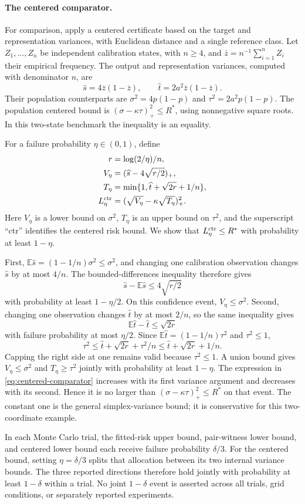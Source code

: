 \paragraph{The centered comparator.}
For comparison, apply a centered certificate based on the target and
representation variances, with Euclidean distance and a single reference
class. Let $Z_1,\ldots,Z_n$
be independent calibration states, with $n\geq4$, and
$\bar z=n^{-1}\sum_{i=1}^nZ_i$ their empirical frequency. The output and
representation variances, computed with denominator $n$, are
\[
 \widehat s=4\bar z(1-\bar z),\qquad
 \widehat t=2a^2\bar z(1-\bar z).
\]
Their population counterparts are
$\sigma^2=4p(1-p)$ and $\tau^2=2a^2p(1-p)$.
The population centered bound is
$(\sigma-\kappa\tau)_+^2\leq R^*$, using nonnegative square roots.
In this two-state benchmark the inequality is an equality.

For a failure probability $\eta\in(0,1)$, define
\begin{align}
 r&=\log(2/\eta)/n,\nonumber\\
 V_\eta&=(\widehat s-4\sqrt{r/2})_+,\nonumber\\
 T_\eta&=\min\{1,\widehat t+\sqrt{2r}+1/n\},\nonumber\\
 L^{\rm ctr}_\eta&=(\sqrt{V_\eta}-\kappa\sqrt{T_\eta})_+^2.
 \label{eq:centered-comparator}
\end{align}
Here $V_\eta$ is a lower bound on $\sigma^2$, $T_\eta$ is an upper
bound on $\tau^2$, and the superscript ``ctr'' identifies the centered
risk bound. We show that $L^{\rm ctr}_\eta\leq R^*$ with probability
at least $1-\eta$.

First, $\mathbb E\widehat s=(1-1/n)\sigma^2\leq\sigma^2$, and
changing one calibration observation changes $\widehat s$ by at most
$4/n$. The bounded-differences inequality therefore gives
\[
 \widehat s-\mathbb E\widehat s\leq4\sqrt{r/2}
\]
with probability at least $1-\eta/2$. On this confidence event,
$V_\eta\leq\sigma^2$.
Second, changing one observation changes $\widehat t$ by at most $2/n$,
so the same inequality gives
\[
 \mathbb E\widehat t-\widehat t\leq\sqrt{2r}
\]
with failure probability at most $\eta/2$. Since
$\mathbb E\widehat t=(1-1/n)\tau^2$ and $\tau^2\leq1$,
\[
 \tau^2\leq\widehat t+\sqrt{2r}+\tau^2/n
          \leq\widehat t+\sqrt{2r}+1/n.
\]
Capping the right side at one remains valid because $\tau^2\leq1$.
A union bound gives $V_\eta\leq\sigma^2$ and
$T_\eta\geq\tau^2$ jointly with probability at least $1-\eta$.
The expression in \eqref{eq:centered-comparator} increases with its first
variance argument and decreases with its second. Hence it is no larger
than $(\sigma-\kappa\tau)_+^2\leq R^*$ on that event. The constant
one is the general simplex-variance bound; it is conservative for this
two-coordinate example.

In each Monte Carlo trial, the fitted-risk upper bound, pair-witness lower
bound, and centered lower bound each receive failure probability $\delta/3$.
For the centered bound, setting $\eta=\delta/3$ splits that allocation
between its two internal variance bounds. The three reported directions
therefore hold jointly with probability at least $1-\delta$ within a
trial. No joint $1-\delta$ event is asserted across all trials, grid
conditions, or separately reported experiments.
